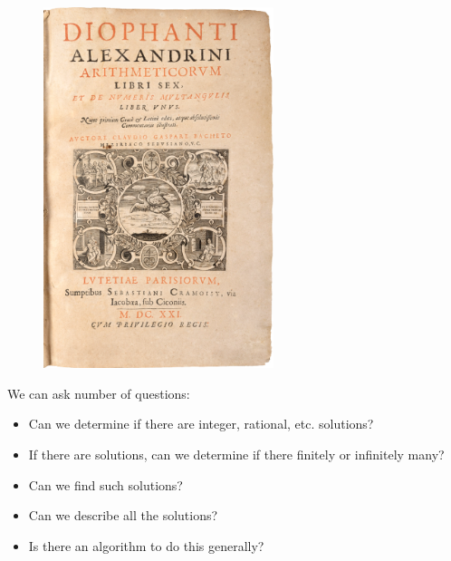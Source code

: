 \begin{frame}[plain]
\begin{minipage}{0.5\textwidth}
	\begin{figure}[ht]
	\centering
	\includegraphics[width=0.6\textwidth]{images/diophantus.png}
	\end{figure}
\end{minipage}\begin{minipage}{0.55\textwidth} \scriptsize
We can ask number of questions:
	\begin{itemize}
	\item Can we determine if there are integer, rational, etc. solutions?
	\item If there are solutions, can we determine if there finitely or infinitely many?
	\item Can we find such solutions?
	\item Can we describe all the solutions?
	\item Is there an algorithm to do this generally?
	\end{itemize}
\end{minipage}
\end{frame}



